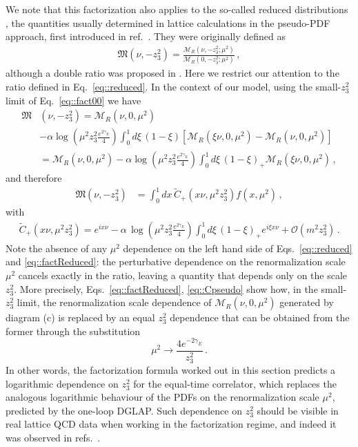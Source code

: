 We note that this factorization also applies to the so-called reduced
distributions \cite{Zhang:2018ggy,Radyushkin:2018cvn}, the quantities usually
determined in lattice calculations in the pseudo-PDF approach, first introduced
in ref.~\cite{Radyushkin:2017cyf}. They were originally defined as
\begin{align}
\label{eq::reduced}
	\mathfrak{M}\left(\nu,-z_3^2\right) =
	\frac{\mathcal{M}_R\left(\nu, -z_3^2; \mu^2\right)}{\mathcal{M}_R\left(0, -z_3^2; \mu^2\right)}\,,
\end{align}
although a double ratio was proposed in \cite{Orginos:2017kos}. Here we restrict our attention to the ratio defined in Eq.~\eqref{eq::reduced}.
In the context of our model, using the small-$z_3^2$ limit of Eq.~\eqref{eq::fact00} we have
\begin{align}
	\mathfrak{M}&\left(\nu,-z_3^2\right) = 
	\mathcal{M}_R\left(\nu,0, \mu^2\right)   \nonumber\\
	&-\alpha \log\left( \mu^2 z_3^2\frac{e^{2\gamma_E}}{4} \right) \int_0^1 d\xi\,\left(1-\xi\right)  
	\left[\mathcal{M}_R\left(\xi \nu,0,\mu^2\right)- \mathcal{M}_R\left(\nu,0,\mu^2\right) \right] \nonumber \\
	& = \mathcal{M}_R\left(\nu, 0, \mu^2\right)  
	-\alpha \log\left( \mu^2 z_3^2\frac{e^{2\gamma_E}}{4} \right) \int_0^1 d\xi\,\left(1-\xi\right)_+ 
	\mathcal{M}_R\left(\xi \nu,0, \mu^2\right)\, ,
\end{align}
and therefore
\begin{align}
	\label{eq::factReduced}
	\mathfrak{M}\left(\nu,-z_3^2\right) &=  
	\int_{0}^{1} dx \, \tilde{C}_+\left(x\nu,\mu^2 z_3^2 \right) f\left(x,\mu^2\right)\,,
\end{align}
with
\begin{align}
	\label{eq::Cpseudo}
	\tilde{C}_+\left(x\nu,\mu^2 z_3^2 \right) =
	 e^{i x\nu} - \alpha\,\log\left( \mu^2 z_3^2\frac{e^{2\gamma_E}}{4} \right)
	 \int_0^1 d\xi \, \left(1-\xi\right)_+ e^{i \xi x\nu} + \mathcal{O}\left(m^2 z_3^2\right)\, .
\end{align}
Note the absence of any $\mu^2$ dependence on the left hand side of
Eqs.~\eqref{eq::reduced} and \eqref{eq::factReduced}: the perturbative
dependence on the renormalization scale $\mu^2$ cancels exactly in the ratio,
leaving a quantity that depends only on the scale $z_3^2$. More precisely,
Eqs.~\eqref{eq::factReduced}, \eqref{eq::Cpseudo} show how, in the small-$z_3^2$
limit, the renormalization scale dependence of
$\mathcal{M}_R\left(\nu,0,\mu^2\right)$ generated by diagram (c) is replaced by
an equal $z_3^2$ dependence that can be obtained from the former through the
substitution  
$$\mu^2 \rightarrow \frac{4 e^{-2\gamma_E}}{z_3^2}\, .$$ In other words, the
factorization formula worked out in this section predicts a logarithmic
dependence on $z_3^2$ for the equal-time correlator, which replaces the
analogous logarithmic behaviour of the PDFs on the renormalization scale
$\mu^2$, predicted by the one-loop DGLAP. Such dependence on $z_3^2$ should be
visible in real lattice QCD data when working in the factorization regime, and
indeed it was observed in refs.~\cite{Radyushkin:2018cvn, Orginos:2017kos}.

